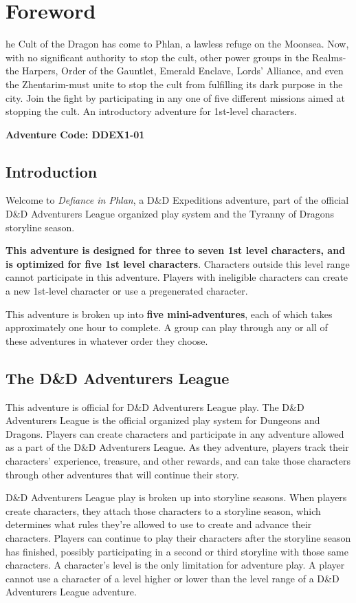 \documentclass[10pt,a4paper,twoside,bg=print,twocolumn,openany,nodeprecatedcode]{dndbook}
\begin{document}
\tableofcontents
\newpage
\chapter{Foreword}
he Cult of the Dragon has come to Phlan, a lawless refuge on the Moonsea. Now, with no significant authority to stop the cult, other power groups in the Realms-the Harpers, Order of the Gauntlet, Emerald Enclave, Lords' Alliance, and even the Zhentarim-must unite to stop the cult from fulfilling its dark purpose in the city. Join the fight by participating in any one of five different missions aimed at stopping the cult. An introductory adventure for 1st-level characters.


\textbf{Adventure Code: DDEX1-01}

\section{Introduction}
Welcome to \textit{Defiance in Phlan}, a D\&D Expeditions adventure, part of the official D\&D Adventurers League organized play system and the Tyranny of Dragons storyline season.

\textbf{This adventure is designed for three to seven 1st level characters, and is optimized for five 1st level characters}. Characters outside this level range cannot participate in this adventure. Players with ineligible characters can create a new 1st-level character or use a pregenerated character.

This adventure is broken up into \textbf{five mini-adventures}, each of which takes approximately one hour to complete. A group can play through any or all of these adventures in whatever order they choose.

\section{The D\&D Adventurers League}
This adventure is official for D\&D Adventurers League play. The D\&D Adventurers League is the official organized play system for Dungeons and Dragons. Players can create characters and participate in any adventure allowed as a part of the D\&D Adventurers League. As they adventure, players track their characters' experience, treasure, and other rewards, and can take those characters through other adventures that will continue their story.

D\&D Adventurers League play is broken up into storyline seasons. When players create characters, they attach those characters to a storyline season, which determines what rules they're allowed to use to create and advance their characters. Players can continue to play their characters after the storyline season has finished, possibly participating in a second or third storyline with those same characters. A character's level is the only limitation for adventure play. A player cannot use a character of a level higher or lower than the level range of a D\&D Adventurers League adventure.
\end{document}

